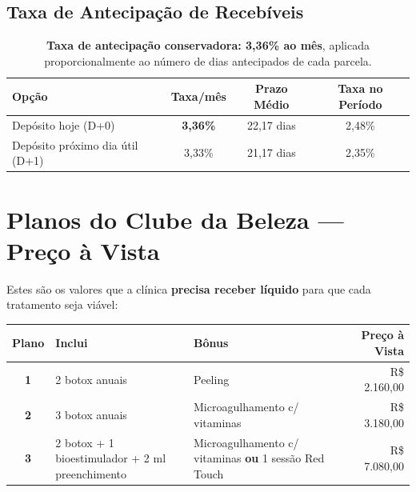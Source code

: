 \documentclass[12pt, a4paper]{article}
\newcommand{\reais}[1]{R\$ #1}
\begin{document}
\subsection{Taxa de Antecipação de Recebíveis}

\begin{table}[H]
    \centering
    \renewcommand{\arraystretch}{1.4}
    \begin{tabularx}{\textwidth}{X c c c}
        \toprule
        \rowcolor{tableHeader} \textbf{Opção} & \textbf{Taxa/mês} & \textbf{Prazo Médio} & \textbf{Taxa no Período} \\
        \midrule
        Depósito hoje (D+0) & \textbf{3,36\%} & 22,17 dias & 2,48\% \\
        \rowcolor{lightGray}
        Depósito próximo dia útil (D+1) & 3,33\% & 21,17 dias & 2,35\% \\
        \bottomrule
    \end{tabularx}
    \caption*{\footnotesize \textbf{Taxa de antecipação conservadora: 3,36\% ao mês}, aplicada proporcionalmente ao número de dias antecipados de cada parcela.}
\end{table}

\needspace{8cm}

\section{Planos do Clube da Beleza — Preço à Vista}

Estes são os valores que a clínica \textbf{precisa receber líquido} para que cada tratamento seja viável:

\begin{table}[H]
    \centering
    \renewcommand{\arraystretch}{1.5}
    \begin{tabularx}{\textwidth}{c X X r}
        \toprule
        \rowcolor{tableHeader} \textbf{Plano} & \textbf{Inclui} & \textbf{Bônus} & \textbf{Preço à Vista} \\
        \midrule
        \textbf{1} & 2 botox anuais & Peeling & \reais{2.160,00} \\
        \rowcolor{lightGray}
        \textbf{2} & 3 botox anuais & Microagulhamento c/ vitaminas & \reais{3.180,00} \\
        \textbf{3} & 2 botox + 1 bioestimulador + 2 ml preenchimento & Microagulhamento c/ vitaminas \textbf{ou} 1 sessão Red Touch & \reais{7.080,00} \\
        \bottomrule
    \end{tabularx}
\end{table}
\end{document}
